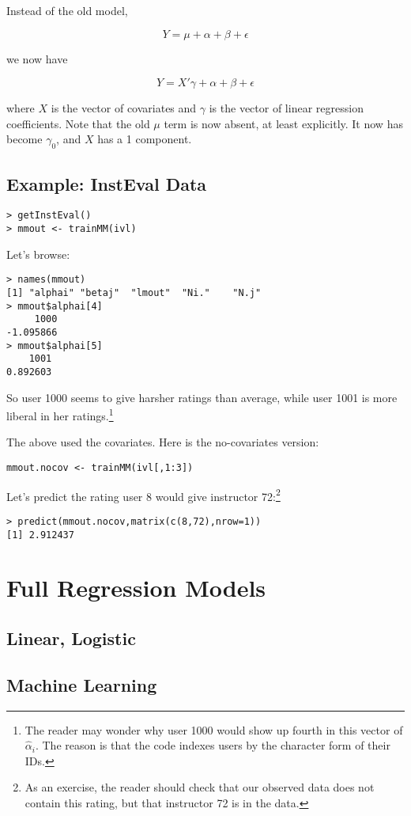 Instead of the old model, 

\begin{equation}
Y = \mu + \alpha + \beta + \epsilon
\end{equation}

we now have

\begin{equation}
Y = X' \gamma + \alpha + \beta + \epsilon
\end{equation}

where $X$ is the vector of covariates and $\gamma$ is the vector of
linear regression coefficients.  Note that the old $\mu$ term is now
absent, at least explicitly.  It now has become $\gamma_0$, and $X$ has
a 1 component.

\subsection{Example:  InstEval Data}

\begin{lstlisting}
> getInstEval()
> mmout <- trainMM(ivl)
\end{lstlisting}

Let's browse:

\begin{lstlisting}
> names(mmout)
[1] "alphai" "betaj"  "lmout"  "Ni."    "N.j" 
> mmout$alphai[4]
     1000 
-1.095866 
> mmout$alphai[5]
    1001 
0.892603 
\end{lstlisting}

So user 1000 seems to give harsher ratings than average, while user 1001
is more liberal in her ratings.\footnote{The reader may wonder why user
1000 would show up fourth in this vector of $\widehat{\alpha}_i$.  The
reason is that the code indexes users by the character form of their
IDs.}

The above used the covariates.  Here is the no-covariates version:

\begin{lstlisting}
mmout.nocov <- trainMM(ivl[,1:3])
\end{lstlisting}

Let's predict the rating user 8 would give instructor 72:\footnote{As an
exercise, the reader should check that our observed data does not
contain this rating, but that instructor 72 is in the data.}

\begin{lstlisting}
> predict(mmout.nocov,matrix(c(8,72),nrow=1))
[1] 2.912437
\end{lstlisting}

\section{Full Regression Models}

\subsection{Linear, Logistic}

\subsection{Machine Learning}
